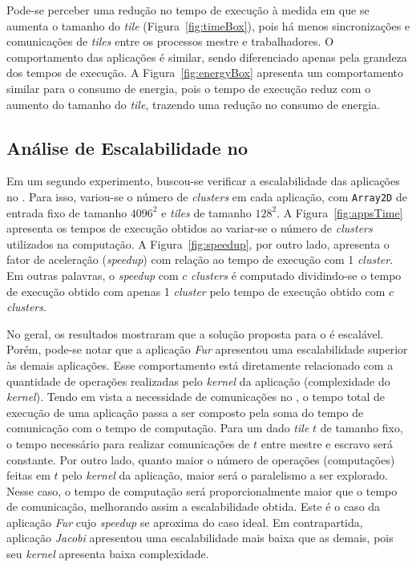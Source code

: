 Pode-se perceber uma redução no tempo de execução à medida em que se aumenta o
tamanho do \textit{tile} (Figura~\ref{fig:timeBox}), pois há menos
sincronizações e comunicações de \textit{tiles} entre os processos mestre e
trabalhadores. O comportamento das aplicações é similar, sendo diferenciado apenas
pela grandeza dos tempos de execução.
A Figura~\ref{fig:energyBox} apresenta um comportamento similar para o consumo
de energia, pois o tempo de execução reduz com o aumento do tamanho do
\textit{tile}, trazendo uma redução no consumo de energia.

\subsection{Análise de Escalabilidade no \mppa}

Em um segundo experimento, buscou-se verificar a escalabilidade das aplicações
no \mppa. Para isso, variou-se o número de \textit{clusters} em cada aplicação,
com \texttt{Array2D} de entrada fixo de tamanho $4096^2$ e \textit{tiles} de
tamanho $128^2$. A Figura~\ref{fig:appsTime} apresenta os tempos de execução
obtidos ao variar-se o número de \textit{clusters} utilizados na computação. A
Figura~\ref{fig:speedup}, por outro lado, apresenta o fator de aceleração
(\textit{speedup}) com relação ao tempo de execução com 1 \textit{cluster}. Em
outras palavras, o \textit{speedup} com $c$ \textit{clusters} é computado
dividindo-se o tempo de execução obtido com apenas 1 \textit{cluster} pelo tempo
de execução obtido com $c$ \textit{clusters}.

No geral, os resultados mostraram que a solução proposta para o \mppa é
escalável. Porém, pode-se notar que a aplicação \textit{Fur} apresentou uma
escalabilidade superior às demais aplicações. Esse comportamento está
diretamente relacionado com a quantidade de operações realizadas pelo
\textit{kernel} da aplicação (complexidade do \textit{kernel}). Tendo em vista a
necessidade de comunicações no \mppa, o tempo total de execução de uma aplicação
passa a ser composto pela soma do tempo de comunicação com o tempo de
computação. Para um dado \textit{tile} $t$ de tamanho fixo, o tempo necessário
para realizar comunicações de $t$ entre mestre e escravo será constante. Por
outro lado, quanto maior o número de operações (computações) feitas em $t$ pelo
\textit{kernel} da aplicação, maior será o paralelismo a ser explorado. Nesse
caso, o tempo de computação será proporcionalmente maior que o tempo de
comunicação, melhorando assim a escalabilidade obtida. Este é o caso da
aplicação \textit{Fur} cujo \textit{speedup} se aproxima do caso ideal. Em
contrapartida, aplicação \textit{Jacobi} apresentou uma escalabilidade mais
baixa que as demais, pois seu \textit{kernel} apresenta baixa complexidade.

